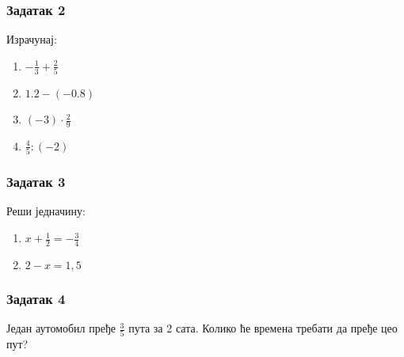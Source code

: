 \documentclass[11pt]{beamer}
\begin{document}
\begin{frame}
\frametitle{Задатак 2}
Израчунај:
\begin{enumerate}
\item $-\frac{1}{3} + \frac{2}{5}$
\item $1.2 - (-0.8)$
\item $(-3) \cdot \frac{2}{9}$
\item $\frac{4}{5} : (-2)$
\end{enumerate}
\end{frame}

\begin{frame}
\frametitle{Задатак 3}
Реши једначину:
\begin{enumerate}
\item $x + \frac{1}{2} = -\frac{3}{4}$
\item $2 - x = 1,\!5$
\end{enumerate}
\end{frame}

\begin{frame}
\frametitle{Задатак 4}
Један аутомобил пређе $\frac{3}{5}$ пута за 2 сата. Колико ће времена требати да пређе цео пут?
\end{frame}
\end{document}

